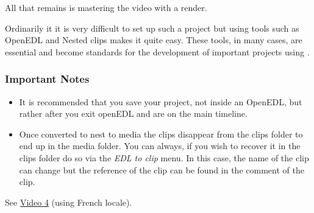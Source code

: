 All that remains is mastering the video with a render.

Ordinarily it it is very difficult to set up such a project but using tools such as OpenEDL and Nested clips makes it quite easy. These tools, in many cases, are essential and become standards for the development of important projects using \CGG{}.

\subsubsection*{Important Notes}
\label{ssub:important_notes}

\begin{itemize}
	\item It is recommended that you save your project, not inside an OpenEDL, but rather after you exit openEDL and are on the main timeline.
	\item Once converted to nest to media the clips disappear from the clips folder to end up in the media folder. You can always, if you wish to recover it in the clips folder do so via the \textit{EDL to clip} menu. In this case, the name of the clip can change but the reference of the clip can be found in the comment of the clip.
\end{itemize}

See \href{https://youtu.be/bfYaBqVbdCo}{Video 4} (using French locale).

